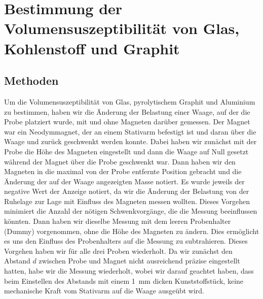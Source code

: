 \documentclass[
	a4paper,
	12pt,
	pagesize,
	ngerman
]{scrartcl}
\begin{document}
	\section{Bestimmung der Volumensuszeptibilität von Glas, Kohlenstoff und Graphit}
	\subsection{Methoden}
	Um die Volumensuszeptibilität von Glas, pyrolytischem Graphit und Aluminium zu bestimmen, haben wir die Änderung der Belastung einer Waage, auf der die Probe platziert wurde, mit und ohne Magneten darüber gemessen. Der Magnet war ein Neodymmagnet, der an einem Stativarm befestigt ist und daran über die Waage und zurück geschwenkt werden konnte. Dabei haben wir zunächst mit der Probe die Höhe des Magneten eingestellt und dann die Waage auf Null gesetzt während der Magnet über die Probe geschwenkt war. Dann haben wir den Magneten in die maximal von der Probe entfernte Position gebracht und die Änderung der auf der Waage angezeigten Masse notiert. Es wurde jeweils der negative Wert der Anzeige notiert, da wir die Änderung der Belastung von der Ruhelage zur Lage mit Einfluss des Magneten messen wollten. Dieses Vorgehen minimiert die Anzahl der nötigen Schwenkvorgänge, die die Messung beeinflussen könnten. Dann haben wir dieselbe Messung mit dem leeren Probenhalter (Dummy) vorgenommen, ohne die Höhe des Magneten zu ändern. Dies ermöglicht es uns den Einfluss des Probenhalters auf die Messung zu subtrahieren. Dieses Vorgehen haben wir für alle drei Proben wiederholt. Da wir zunächst den Abstand $d$ zwischen Probe und Magnet nicht ausreichend präzise eingestellt hatten, habe wir die Messung wiederholt, wobei wir darauf geachtet haben, dass beim Einstellen des Abstands mit einem \SI{1}{\milli \meter} dicken Kunststoffstück, keine mechanische Kraft vom Stativarm auf die Waage ausgeübt wird. 
\end{document}

